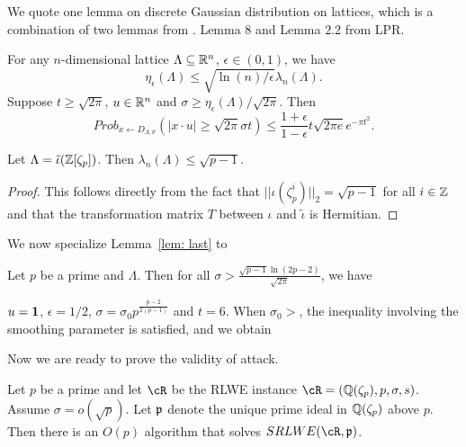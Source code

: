 \documentclass{amsart}
\begin{document}

\iffalse
We quote one lemma on discrete Gaussian distribution on lattices, which is a combination of two lemmas from \cite{langlois2014worst}. Lemma 8 and Lemma 2.2  from LPR.
\begin{Lemma}
\label{lem: last}
For any $n$-dimensional lattice $\Lambda \subseteq \mathbb{R}^n$, $\epsilon \in (0,1)$, we have
$$\eta_\epsilon(\Lambda) \leq \sqrt{\ln(n)/\epsilon} \lambda_n(\Lambda).$$
Suppose $t \geq \sqrt{2 \pi}$, $u \in \mathbb{R}^n$ and $\sigma \geq \eta_\epsilon(\Lambda)/\sqrt{2 \pi}$. Then
\[
    Prob_{x \gets D_{\Lambda,\sigma}}(|x \cdot u| \geq \sqrt{2 \pi}\sigma t) \leq \frac{1+\epsilon}{1-\epsilon} t \sqrt{2 \pi e} e^{- \pi t^2}.
\]
\end{Lemma}


\begin{Lemma}
Let $\Lambda = \tilde{\iota}(\mathbb{Z}[\zeta_p])$. Then $\lambda_n(\Lambda) \leq \sqrt{p-1}$.
\end{Lemma}

\begin{proof}
This follows directly from the fact that $||\iota(\zeta_p^i)||_2 = \sqrt{p-1}$ for all $i \in \mathbb{Z}$ and that the transformation matrix $T$ between $\iota$ and $\tilde{\iota}$ is Hermitian.
\end{proof}


We now specialize Lemma~\ref{lem: last} to

\begin{Prop}
Let $p$ be a prime and $\Lambda$. Then for all $\sigma > \frac{\sqrt{p-1} \ln(2p-2)}{\sqrt{2 \pi}}$, we have
\end{Prop}
$u = {\bf 1}$, $\epsilon = 1/2$, $\sigma = \sigma_0 p^{\frac{p-2}{2(p-1)}}$ and $t = 6$. When $\sigma_0 > $, the inequality involving the smoothing parameter is satisfied, and we obtain

Now we are ready to prove the validity of attack.
\begin{theorem}
Let $p$ be a prime and let $\cR$ be the RLWE instance $\cR = (\bQ(\zeta_p), p, \sigma,s)$.
Assume $\sigma = o(\sqrt{p})$. Let $\mathfrak{p}$ denote the unique prime ideal in $\mathbb{Q}(\zeta_p)$ above $p$. Then there is an $O(p)$ algorithm that solves $SRLWE(\cR,\fp)$.
\end{theorem}
\end{document}

